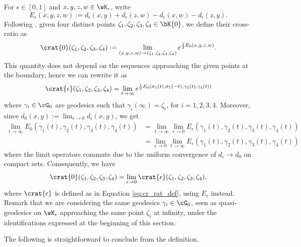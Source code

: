 \documentclass[reqno,11pt]{amsart}
\begin{document}
    \par For \(\epsilon \in [0,1]\) and \(x, y, z, w \in \wK_\epsilon\), write 
    \[
        E_{\epsilon}(x, y, z, w) := d_\epsilon(x, y) + d_\epsilon(z, w) - d_\epsilon(x, w) - d_\epsilon(z, y).
    \]
    Following \cite{otal_sur_1992, bourdon_sur_1996}, given four distinct points \(\zeta_1, \zeta_2, \zeta_3, \zeta_4 \in \bK{0}\), we define their cross-ratio as
    \[
        \crat{0}(\zeta_1, \zeta_2, \zeta_3, \zeta_4) := \lim_{(x,y,z,w) \to (\zeta_1, \zeta_2, \zeta_3, \zeta_4)} e^{\frac{1}{2}E_0(x, y, z, w)}.
    \]
    This quantity does not depend on the sequences approaching the given points at the boundary, hence we can rewrite it as
    \begin{equation}\label{eq:cr_rat_def}
        \crat{\epsilon}(\zeta_1, \zeta_2, \zeta_3, \zeta_4) = \lim_{t \to \infty} e^{\frac{1}{2}E_0(\sigma_1(t), \sigma_1(-t), \gamma_3(t), \gamma_4(t))}
    \end{equation}
    where \(\gamma_i \in \cG_0\) are geodesics such that \(\gamma_i(\infty) = \zeta_i\), for \(i = 1,2,3,4\).
    Moreover, since \(d_0(x,y) := \lim_{\epsilon \to 0}d_\epsilon(x,y)\), we get
    \begin{align*}
        \lim_{t \to \infty}E_0(\gamma_1(t), \gamma_2(t), \gamma_3(t), \gamma_4(t)) &= \lim_{t \to \infty}\lim_{\epsilon \to 0}E_\epsilon(\gamma_1(t), \gamma_2(t), \gamma_3(t), \gamma_4(t)) \\
        &= \lim_{\epsilon \to 0}\lim_{t \to \infty}E_\epsilon(\gamma_1(t), \gamma_2(t), \gamma_3(t), \gamma_4(t))        
    \end{align*}
    where the limit operators commute due to the uniform convergence of \(d_\epsilon \to d_0\) on compact sets.
    Consequently, we have
     \begin{equation}\label{eq:cr_rat_lim}
        \crat{0}(\zeta_1, \zeta_2, \zeta_3, \zeta_4)
        = \lim_{\epsilon \to 0} \crat{\epsilon}(\zeta_1, \zeta_2, \zeta_3, \zeta_4),
    \end{equation}
    where \(\crat{\epsilon}\) is defined as in Equation \eqref{eq:cr_rat_def}, using \(E_\epsilon\) instead.
    Remark that we are considering the same geodesics \(\gamma_i \in \cG_0\), seen as quasi-geodesics on \(\wK_\epsilon\) approaching the same point \(\zeta_i\) at infinity, under the identifications expressed at the beginning of this section.
    \par The following is straightforward to conclude from the definition.
\end{document}
